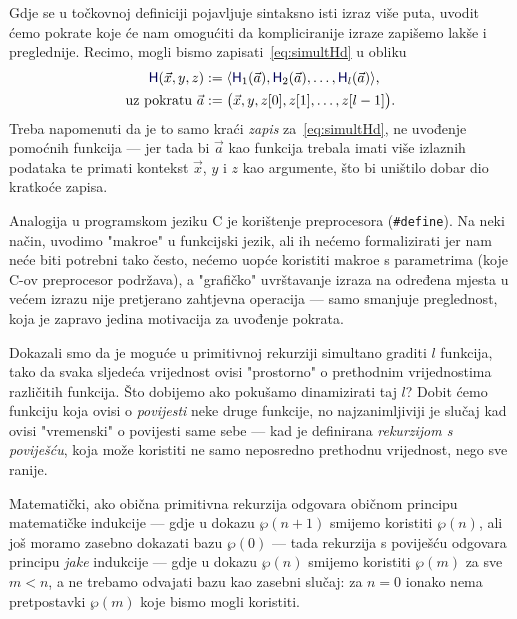 \begin{napomena}[{name=[pokrate u točkovnim definicijama]}]
Gdje se u točkovnoj definiciji pojavljuje sintaksno isti izraz više puta, uvodit ćemo pokrate koje će nam omogućiti da kompliciranije izraze zapišemo lakše i preglednije. Recimo, mogli bismo zapisati~\eqref{eq:simultHd} u obliku
\begin{align*}
    \f H(\vec x,y,z)&:=\langle \f H_1(\vec a),\f H_2(\vec a),\dotsc,\f H_l(\vec a)\rangle\text,\\
    \text{uz pokratu } \vec a&:=\bigl(\vec x,y,z[0],z[1],\dotsc,z[l-1]\bigr)\text.
\end{align*}
Treba napomenuti da je to samo kraći \emph{zapis} za~\eqref{eq:simultHd}, ne uvođenje pomoćnih funkcija --- jer tada bi $\vec a$ kao funkcija trebala imati više izlaznih podataka te primati kontekst $\vec x$, $y$ i $z$ kao argumente, što bi uništilo dobar dio kratkoće zapisa.

Analogija u programskom jeziku C je korištenje preprocesora (\verb+#define+). Na neki način, uvodimo "makroe" u funkcijski jezik, ali ih nećemo formalizirati jer nam neće biti potrebni tako često, nećemo uopće koristiti makroe s parametrima (koje C-ov preprocesor podržava), a "grafičko" uvrštavanje izraza na određena mjesta u većem izrazu nije pretjerano zahtjevna operacija --- samo smanjuje preglednost, koja je zapravo jedina motivacija za uvođenje pokrata.
\end{napomena}

Dokazali smo da je moguće u primitivnoj rekurziji simultano graditi $l$ funkcija, tako da svaka sljedeća vrijednost ovisi "prostorno" o prethodnim vrijednostima različitih funkcija. Što dobijemo ako pokušamo dinamizirati taj $l$? Dobit ćemo funkciju koja ovisi o \emph{povijesti} neke druge funkcije, no najzanimljiviji je slučaj kad ovisi "vremenski" o povijesti same sebe --- kad je definirana \emph{rekurzijom s poviješću}, koja može koristiti ne samo neposredno prethodnu vrijednost, nego sve ranije.

Matematički, ako obična primitivna rekurzija odgovara običnom principu matematičke indukcije --- gdje u dokazu $\wp(n+1)$ smijemo koristiti $\wp(n)$, ali još moramo zasebno dokazati bazu $\wp(0)$ --- tada rekurzija s poviješću odgovara principu \emph{jake} indukcije --- gdje u dokazu $\wp(n)$ smijemo koristiti $\wp(m)$ za sve $m<n$, a ne trebamo odvajati bazu kao zasebni slučaj: za $n=0$ ionako nema pretpostavki $\wp(m)$ koje bismo mogli koristiti.

